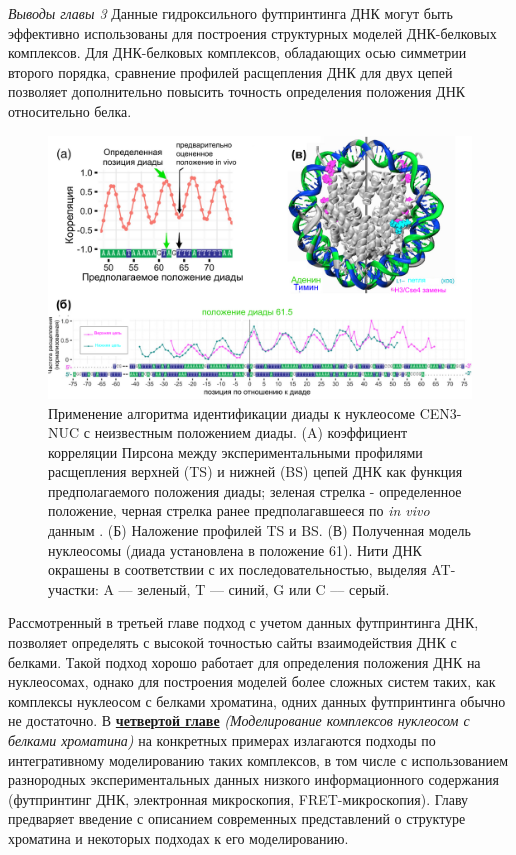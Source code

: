\textit{Выводы главы 3} \newline
Данные гидроксильного футпринтинга ДНК могут быть эффективно использованы для построения структурных моделей ДНК-белковых комплексов. Для ДНК-белковых комплексов, обладающих осью симметрии второго порядка, сравнение профилей расщепления ДНК для двух цепей позволяет дополнительно повысить точность определения положения ДНК относительно белка. 
\begin{figure}[H]
    \centering
    \includegraphics[width=\textwidth]{images/p5/part5_2_nar/p5_2_f8.pdf}
    \caption[Применение алгоритма идентификации диады  к нуклеосоме CEN3-NUC с неизвестным положением диады.]{Применение алгоритма идентификации диады к нуклеосоме CEN3-NUC с неизвестным положением диады. (A) коэффициент корреляции Пирсона между экспериментальными профилями расщепления верхней (TS) и нижней (BS) цепей ДНК как функция предполагаемого положения диады; зеленая стрелка - определенное положение, черная стрелка ранее предполагавшееся по \textit{in vivo} данным \cite{cole_centromeric_2011}. (Б) Наложение профилей TS и BS. (В) Полученная модель нуклеосомы (диада установлена в положение 61). Нити ДНК окрашены в соответствии с их последовательностью, выделяя AT-участки: A –– зеленый, T –– синий, G или C –– серый.}
    \label{fig:p5:p5_2_f8}
\end{figure}
Рассмотренный в третьей главе подход с учетом данных футпринтинга ДНК, позволяет определять с высокой точностью сайты взаимодействия ДНК с белками. Такой подход хорошо работает для определения положения ДНК на нуклеосомах, однако для построения моделей более сложных систем таких, как комплексы нуклеосом с белками хроматина, одних данных футпринтинга обычно не достаточно. В \underline{\textbf{четвертой главе}} \textit{(Моделирование комплексов нуклеосом с белками хроматина)} на конкретных примерах излагаются подходы по интегративному моделированию таких комплексов, в том числе с использованием разнородных экспериментальных данных низкого информационного содержания (футпринтинг ДНК, электронная микроскопия, FRET-микроскопия). Главу предваряет введение с описанием современных представлений о структуре хроматина и некоторых подходах к его моделированию.

